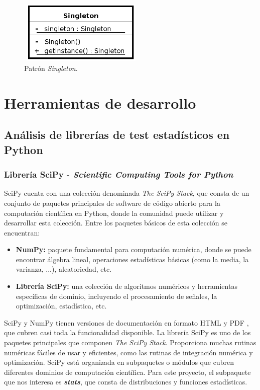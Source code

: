 \begin{figure}[H]
\centering
\includegraphics[width=6cm,height=3cm]{figuras/singleton.png}
\caption{Patrón \textit{Singleton}.}
\label{fig:singleton}
\end{figure}

\section{Herramientas de desarrollo}

\subsection{Análisis de librerías de test estadísticos en Python} \label{libreriastest}

\subsubsection{\textbf{Librería SciPy - \textit{Scientific Computing Tools for Python}}}
SciPy \cite{scipy} cuenta con una colección denominada \textit{The SciPy Stack}, que consta de un conjunto de paquetes principales de software de código abierto para la computación científica en Python, donde la comunidad puede utilizar y desarrollar esta colección. Entre los paquetes básicos de esta colección se encuentran:
\begin{itemize}
\item \textbf{NumPy:} paquete fundamental para computación numérica, donde se puede encontrar álgebra lineal, operaciones estadísticas básicas (como la media, la varianza, ...), aleatoriedad, etc. 
\item \textbf{Librería SciPy:} una colección de algoritmos numéricos y herramientas específicas de dominio, incluyendo el procesamiento de señales, la optimización, estadística, etc.
\end{itemize}
SciPy y NumPy tienen versiones de documentación en formato HTML y PDF \cite{scipy-doc}, que cubren casi toda la funcionalidad disponible.
La librería SciPy es uno de los paquetes principales que componen \textit{The SciPy Stack}. Proporciona muchas rutinas numéricas fáciles de usar y eficientes, como las rutinas de integración numérica y optimización. SciPy está organizada en subpaquetes o módulos que cubren diferentes dominios de computación científica. Para este proyecto, el subpaquete que nos interesa es \textit{\textbf{stats}}, que consta de distribuciones y funciones estadísticas.

